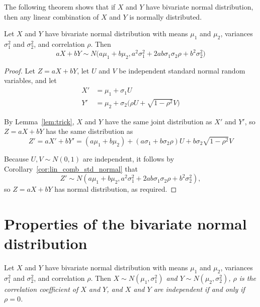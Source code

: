 The following theorem shows that if $X$ and $Y$ have bivariate normal distribution, then any linear combination of $X$ and $Y$ is normally distributed.
\begin{theorem}\label{thm:lin_comb_bivar_normal}
Let $X$ and $Y$ have bivariate normal distribution with means $\mu_1$ and $\mu_2$, variances $\sigma_1^2$ and $\sigma_2^2$, and correlation $\rho$. Then
\[
aX + bY \sim N\big(a\mu_1 + b\mu_2, a^2\sigma_1^2 + 2ab\sigma_1\sigma_2\rho + b^2\sigma_2^2\big)
\]
\end{theorem}
\begin{proof}
Let $Z=aX+bY$, let $U$ and $V$ be independent standard normal random variables, and let
\begin{align*}
X' & = \mu_1 + \sigma_1 U \\
Y' & = \mu_2 + \sigma_2\big(\rho U +\sqrt{1-\rho^2}V\big)
\end{align*}

By Lemma~\ref{lem:trick}, $X$ and $Y$ have the same joint distribution as $X'$ and $Y'$, so $Z=aX+bY$ has the same distribution as 
\[
Z' = aX'+bY' = (a\mu_1 + b\mu_2) + (a\sigma_1 + b\sigma_2\rho)U + b\sigma_2\sqrt{1-\rho^2} V
\]

Because $U,V\sim N(0,1)$ are independent, it follows by Corollary~\ref{cor:lin_comb_std_normal} that
\[
Z' \sim N\left(a\mu_1 + b\mu_2, a^2\sigma_1^2 + 2ab\sigma_1\sigma_2\rho + b^2\sigma_2^2\right),
\]
so $Z=aX+bY$ has normal distribution, as required.
\end{proof}

\section{Properties of the bivariate normal distribution} 

\begin{theorem}
Let $X$ and $Y$ have bivariate normal distribution with means $\mu_1$ and $\mu_2$, variances $\sigma_1^2$ and $\sigma_2^2$, and correlation $\rho$. Then
\ben
\it $X\sim N(\mu_1,\sigma_1^2)$ and $Y\sim N(\mu_2,\sigma_2^2)$,
\it $\rho$ is the correlation coefficient of $X$ and $Y$, and
\it $X$ and $Y$ are independent if and only if $\rho=0$.
\een
\end{theorem}

